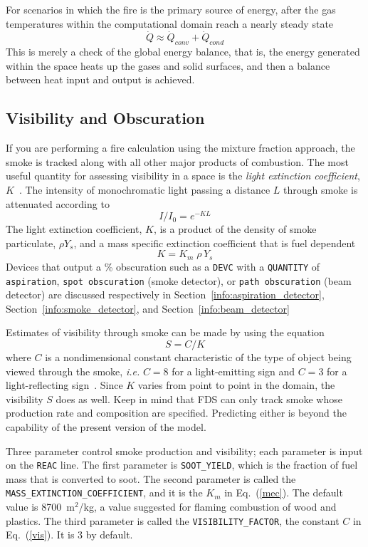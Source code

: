 \documentclass[11pt]{book}
\newcommand{\ct}{\tt\small}
\newcommand{\be}{\begin{equation}}
\newcommand{\ee}{\end{equation}}
\begin{document}
For scenarios in which the fire is the primary source of energy, after the gas temperatures
within the computational domain reach a nearly steady state
\be \dot{Q} \approx \dot{Q}_{conv} + \dot{Q}_{cond}  \ee
This is merely a check of the global energy balance, that is, the energy generated within the space
heats up the gases and solid surfaces, and then a balance between heat input and output is achieved.



\subsection{Visibility and Obscuration}
\label{info:visibility}
\label{info:obscuration}

If you are performing a fire calculation using the mixture fraction
approach, the smoke is tracked
along with all other major products of combustion. The most useful
quantity for assessing visibility in a space is the {\em light
extinction coefficient}, $K$~\cite{SFPE:Mulholland}. The intensity of
monochromatic light passing a distance $L$ through smoke
is attenuated according to
\be I/I_0 = e^{-KL} \ee
The light extinction coefficient, $K$, is a product of the
density of smoke particulate, $\rho Y_s$, and a mass specific
extinction coefficient that is fuel dependent
\be K = K_m \; \rho \, Y_s \label{mec} \ee
Devices that output a \% obscuration such as a {\ct DEVC} with a {\ct QUANTITY} of
{\ct aspiration}, {\ct spot obscuration} (smoke detector), or {\ct path obscuration} (beam detector)
are discussed respectively in Section~\ref{info:aspiration_detector}, Section~\ref{info:smoke_detector},
and Section~\ref{info:beam_detector}

Estimates of visibility through smoke can be made by using the
equation
\be  S = C/K  \label{vis}  \ee
where $C$ is a nondimensional constant characteristic of
the type of object being viewed through the smoke, {\em i.e.}
$C=8$ for a light-emitting sign and $C=3$ for a light-reflecting
sign~\cite{SFPE:Mulholland}. Since $K$ varies from point to point in the
domain, the visibility $S$ does as well. Keep in mind that
FDS can only track smoke whose production rate and composition
are specified. Predicting either is beyond the
capability of the present version of the model.

Three parameter control smoke production and visibility; each
parameter is input on the {\ct REAC} line. The first parameter
is {\ct SOOT\_YIELD}, which is the fraction of fuel mass that
is converted to soot. The second parameter is called the
{\ct MASS\_EXTINCTION\_COEFFICIENT}, and it is the $K_m$ in
Eq.~(\ref{mec}). The default value is 8700~m$^2$/kg, a value
suggested for flaming combustion of wood and plastics.
The third parameter is called the {\ct VISIBILITY\_FACTOR}, the
constant $C$ in Eq.~(\ref{vis}). It is 3 by default.
\end{document}
